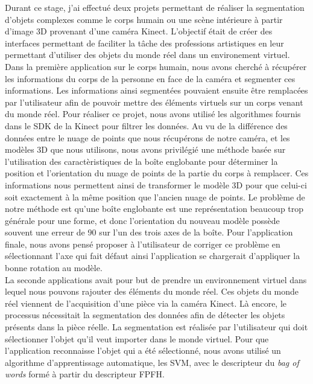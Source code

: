 Durant ce stage, j'ai effectué deux projets permettant de réaliser la segmentation d'objets complexes comme le corps
humain ou une scène intérieure à partir d'image 3D provenant d'une caméra Kinect. L'objectif était de créer
des interfaces permettant de faciliter la tâche des professions artistiques en leur permettant d'utiliser 
des objets du monde réel dans un environement virtuel. Dans la première application sur le corps humain,
nous avons cherché à récupérer les informations du corps de la personne en face de la caméra et segmenter
ces informations. Les informations ainsi segmentées pouvaient ensuite être remplacées par l'utilisateur afin de 
pouvoir mettre des éléments virtuels sur un corps venant du monde réel. Pour réaliser ce projet, nous avons 
utilisé les algorithmes fournis dans le SDK de la Kinect pour filtrer les données. Au vu de la différence
des données entre le nuage de points que nous récupérons de notre caméra, et les modèles 3D que nous utilisons,
nous avons privilégié une méthode basée sur l'utilisation des caractèristiques de la boîte englobante pour
déterminer la position et l'orientation du nuage de points de la partie du corps à remplacer. Ces informations
nous permettent ainsi de transformer le modèle 3D pour que celui-ci soit exactement à la même position que
l'ancien nuage de points. Le problème de notre méthode est qu'une boîte englobante est une représentation 
beaucoup trop générale pour une forme, et donc l'orientation du nouveau modèle possède souvent une erreur de 90\degre
sur l'un des trois axes de la boîte. Pour l'application finale, nous avons pensé proposer à l'utilisateur de 
corriger ce problème en sélectionnant l'axe qui fait défaut ainsi l'application se chargerait d'appliquer la
bonne rotation au modèle.\\

La seconde applications avait pour but de prendre un environnement virtuel dans lequel nous pouvons rajouter des éléments 
du monde réel. Ces objets du monde réel viennent de l'acquisition d'une pièce via la caméra Kinect. Là encore, le processus nécessitait 
la segmentation des données afin de détecter les objets présents dans la pièce réelle. La segmentation est réalisée 
par l'utilisateur qui doit sélectionner l'objet qu'il veut importer dans le monde virtuel. Pour que l'application
reconnaisse l'objet qui a été sélectionné, nous avons utilisé un algorithme d'apprentissage automatique, les SVM,
avec le descripteur du \textit{bag of words} formé à partir du descripteur FPFH.\\

